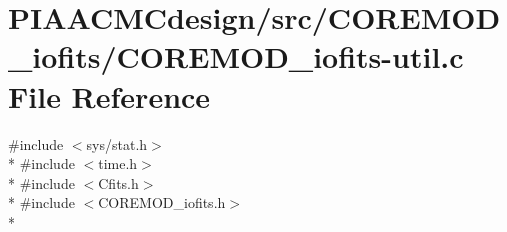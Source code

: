 \hypertarget{PIAACMCdesign_2src_2COREMOD__iofits_2COREMOD__iofits-util_8c}{\section{P\+I\+A\+A\+C\+M\+Cdesign/src/\+C\+O\+R\+E\+M\+O\+D\+\_\+iofits/\+C\+O\+R\+E\+M\+O\+D\+\_\+iofits-\/util.c File Reference}
\label{PIAACMCdesign_2src_2COREMOD__iofits_2COREMOD__iofits-util_8c}
}
{\ttfamily \#include $<$sys/stat.\+h$>$}\\*
{\ttfamily \#include $<$time.\+h$>$}\\*
{\ttfamily \#include $<$Cfits.\+h$>$}\\*
{\ttfamily \#include $<$C\+O\+R\+E\+M\+O\+D\+\_\+iofits.\+h$>$}\\*
